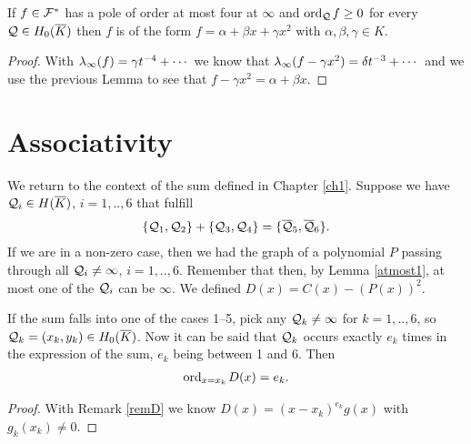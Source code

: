\documentclass[english,11pt,a4paper]{article}
\begin{document}
\begin{lemma}\label{fourpoles}
  If $f \in \mathcal{F}^*$ has a pole of order at most four at $\infty$ and $\text{ord}_{\mathcal{Q}}\hspace{0.4mm} f \geq 0$ for every $\mathcal{Q} \in H_0(\overline K)$ then $f$ is of the form $f = \alpha + \beta x + \gamma x^2$ with $\alpha, \beta, \gamma \in K$.
  \begin{proof}
    With $\lambda_{\infty} (f) = \gamma t^{-4} + \cdots$ we know that $\lambda_{\infty} (f - \gamma x^2) = \delta t^{-3} + \cdots$ and we use the previous Lemma to see that $f - \gamma x^2 = \alpha + \beta x$.
  \end{proof}
\end{lemma}

\newpage

\section{Associativity}

We return to the context of the sum defined in Chapter \ref{ch1}. Suppose we have $\mathcal{Q}_i \in H(\overline K)$, $i=1,..,6$ that fulfill
\begin{align*}
  \{ \mathcal{Q}_1 , \mathcal{Q}_2\}+\{\mathcal{Q}_3 , \mathcal{Q}_4\} = \{\overline {\mathcal{Q}}_5 , \overline {\mathcal{Q}}_6 \}.
\end{align*}
If we are in a non-zero case, then we had the graph of a polynomial $P$ passing through all $\mathcal{Q}_i \neq \infty$, $i = 1,..,6$. Remember that then, by Lemma \ref{atmost1}, at most one of the $\mathcal{Q}_i$ can be $\infty$. We defined $D(x) = C(x) - (P(x))^2$.
\begin{lemma}\label{mult}
  If the sum falls into one of the cases 1--5, pick any $\mathcal{Q}_k \neq \infty$ for $k = 1,..,6$, so $\mathcal{Q}_k = (x_k, y_k) \in H_0(\overline K)$. Now it can be said that $\mathcal{Q}_k$ occurs exactly $e_k$ times in the expression of the sum, $e_k$ being between
  1 and 6. %
  Then\vspace{-3mm}
  \begin{align*}
    \text{ord}_{x=x_k}\hspace{0.4mm} D(x) = e_k.
  \end{align*}
  \begin{proof} With  Remark \ref{remD} we know $D(x) = (x - x_k)^{e_k} g(x)$ with $g_k(x_k) \neq 0$.
  \end{proof}
\end{lemma}
\end{document}
